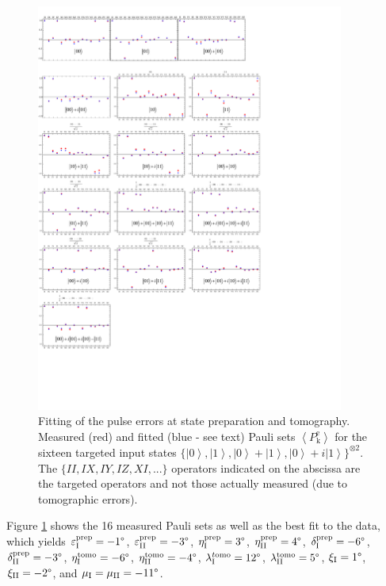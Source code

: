 \begin{figure}[htp!]
	\centering
	\includegraphics[width=0.9\textwidth]{./material/papers/iswap/submission1/error_model}
	\caption{Fitting of the pulse errors at state preparation and tomography. Measured
(red) and fitted (blue - see text) Pauli sets $\left\langle P_{\mathrm{k}}^{\mathrm{e}}\right\rangle $
for the sixteen targeted input states $\{\left|0\right\rangle ,\left|1\right\rangle ,\left|0\right\rangle +\left|1\right\rangle ,\left|0\right\rangle +i\left|1\right\rangle \}^{\otimes2}$.
The $\{II,IX,IY,IZ,XI,...\}$ operators indicated on the abscissa are
the targeted operators and not those actually measured (due to tomographic
errors).}
	\label{fig:fit_Pulse_Errors}
\end{figure}

\smallskip

Figure \ref{fig:fit_Pulse_Errors} shows the 16 measured Pauli sets as well as the best fit to the data, which yields $\varepsilon_{\mathrm{I}}^{\mathrm{prep}}=-1\text{\textdegree}$,
$\varepsilon_{\mathrm{II}}^{\mathrm{prep}}=-3\text{\textdegree}$,
$\eta_{\mathrm{I}}^{\mathrm{prep}}=3\text{\textdegree}$, $\mathrm{\eta}_{\mathrm{II}}^{\mathrm{prep}}=4\text{\textdegree}$,
$\delta_{\mathrm{I}}^{\mathrm{prep}}=-6\text{\textdegree}$, $\delta_{\mathrm{II}}^{\mathrm{prep}}=-3\text{\textdegree}$,
$\eta_{\mathrm{I}}^{\mathrm{tomo}}=-6\text{\textdegree}$, $\eta_{\mathrm{II}}^{\mathrm{tomo}}=-4\text{\textdegree}$,
$\lambda_{\mathrm{I}}^{t\mathrm{omo}}=12\text{\textdegree}$, $\lambda_{\mathrm{II}}^{\mathrm{tomo}}=5\text{\textdegree}$,
$\xi_{\mathrm{I}}=1\text{\textdegree}$, $\xi_{\mathrm{II}}=-2\text{\textdegree}$,
and $\mu_{\mathrm{I}}=\mu_{\mathrm{II}}=-11\text{\textdegree}$. 

